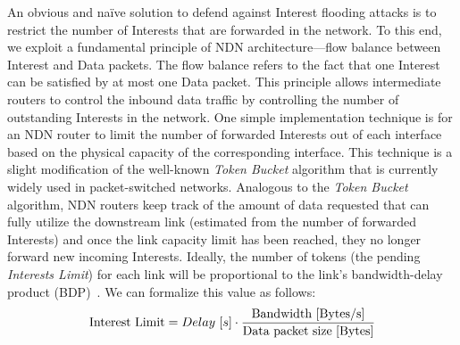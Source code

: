 




An obvious and na\"ive solution to defend against Interest flooding attacks is to restrict the number of Interests that are forwarded in the network. To this end, we exploit a 
 fundamental principle of NDN architecture---flow balance between Interest and Data packets. The flow balance refers to the fact that one Interest can be satisfied by at most one Data packet. This principle allows intermediate routers to control the inbound data traffic by controlling the number of outstanding Interests in the network. 
One simple implementation technique  is for an NDN router to limit the number of forwarded Interests out of each interface based on the physical capacity of the corresponding interface. This technique is a slight modification of the well-known {\it Token Bucket} algorithm that is currently widely used in packet-switched networks. Analogous to the {\it Token Bucket} algorithm, NDN routers keep track of the amount of data requested that can fully utilize the downstream link (estimated from the number of forwarded Interests) and once the link capacity limit has been reached, they no longer forward new incoming Interests. Ideally, the number of tokens (the pending \emph{Interests Limit}) for each link will be proportional to the link's bandwidth-delay product (BDP)~\cite{tcp-survey}. We can formalize this value as follows:
%
\begin{equation}
\small \mathrm{Interest\ Limit} = Delay\ [s] \cdot \frac{\mathrm{Bandwidth\ [Bytes/s]}}{\mathrm{Data\ packet\ size\ [Bytes]}}
\end{equation}


